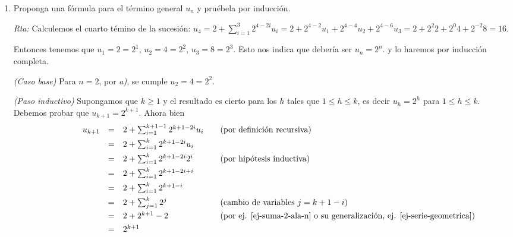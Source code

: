\documentclass[a4paper,12pt,twoside,spanish,reqno]{amsbook}
\numberwithin{equation}{section}
\newcommand{\rta}{\noindent\textit{Rta: }}
\begin{document}
\begin{enumerate}
\begin{enumerate}
            \rta $u_2 = 2+\sum_{i=1}^{1}2^{2-2i}u_i = 2+2^{2-2}u_1 = 2 + u_1 = 4$.
            
            $u_3 = 2+\sum_{i=1}^{2}2^{3-2i}u_i = 2+2^{3-2}u_1 + 2^{3-4}u_2=2+2^12 + 2^{-1}4 = 8$.
            
            \item Proponga una fórmula para el término general $u_n$ y pruébela por inducción.
            
            \rta Calculemos el cuarto témino de la sucesión: $u_4 =  2+\sum_{i=1}^{3}2^{4-2i}u_i = 2+2^{4-2}u_1 + 2^{4-4}u_2 + 2^{4-6}u_3= 2+2^2 2 + 2^{0}4 + 2^   {-2}8 = 16$. 
            
            Entonces tenemos que $u_1 = 2 = 2^1$, $u_2 = 4 = 2^2$, $u_3 = 8 = 2^3$. Esto nos indica que debería ser $u_n = 2^n$.  y lo haremos por inducción completa. 
            
            \textit{(Caso base) } Para $n=2$, por \textit{a)}, se cumple $u_2 = 4 =2^2$. 
            
            \textit{(Paso inductivo) } Supongamos que $k \ge 1$ y el resultado  es cierto para los $h$ tales que  $1 \le h \le k$,  es decir $u_h=2^h$ para $1 \le h \le k$. Debemos probar que $u_{k+1} = 2^{k+1}$. Ahora bien
            \begin{equation*}
            \qquad\qquad\begin{matrix}
            u_{k+1} &=& 2+\sum_{i=1}^{k+1-1}2^{k+1-2i}u_i \hfill &\quad \text{(por definición recursiva)} \hfill \\[4pt]
            &=& 2+\sum_{i=1}^{k}2^{k+1-2i}u_i \hfill &\hfill\\[4pt]
            &=& 2+\sum_{i=1}^{k}2^{k+1-2i}2^i \hfill &\quad \text{(por hipótesis inductiva)}\hfill \\[4pt]
            &=& 2+\sum_{i=1}^{k}2^{k+1-2i+ i} \hfill  & \hfill\\[4pt]
            &=& 2+\sum_{i=1}^{k}2^{k+1-i} \hfill  & \hfill\\[4pt]
            &=& 2+\sum_{j=1}^{k}2^{j} \hfill  &\quad \text{(cambio de variables $j =k +1-i$)}\hfill \\[4pt]
            &=& 2+2^{k+1} -2 \hfill  &\quad \text{(por ej. \ref{ej-suma-2-ala-n} o su generalización, ej. \ref{ej-serie-geometrica})}\hfill \\[4pt]
            &=& 2^{k+1} \hfill  &\quad \hfill
            \end{matrix}
            \end{equation*} 
        \end{enumerate}


\end{enumerate}
\end{document}
